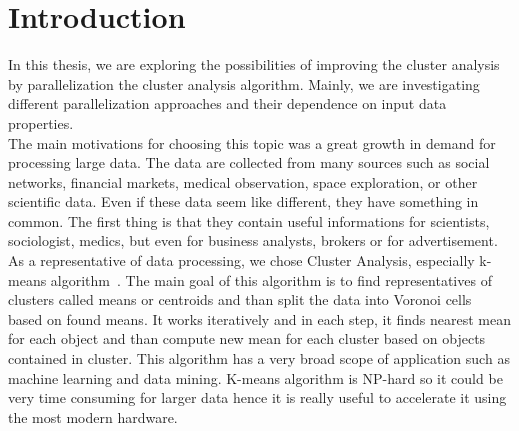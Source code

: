 \pagestyle{plain}
\setcounter{page}{1}

\chapter{Introduction}

In this thesis, we are exploring the possibilities of improving the cluster analysis by parallelization the cluster analysis algorithm. Mainly, we are investigating different parallelization approaches and their dependence on input data properties.\\
The main motivations for choosing this topic was a great growth in demand for processing large data. The data are collected from many sources such as social networks, financial markets, medical observation, space exploration, or other scientific data. Even if these data seem like different, they have something in common. The first thing is that they contain useful informations for scientists, sociologist, medics, but even for business analysts, brokers or for advertisement. %
\\

As a representative of data processing, we chose Cluster Analysis, especially k-means algorithm~\cite{Aggarwal13, EstivillCastro02}. The main goal of this algorithm is to find representatives of clusters called means or centroids and than split the data into Voronoi cells~\cite{Kim14} based on found means. It works iteratively and in each step, it finds nearest mean for each object and than compute new mean for each cluster based on objects contained in cluster. This algorithm has a very broad scope of application such as machine learning and data mining. K-means algorithm is NP-hard so it could be very time consuming for larger data hence it is really useful to accelerate it using the most modern hardware.\\

